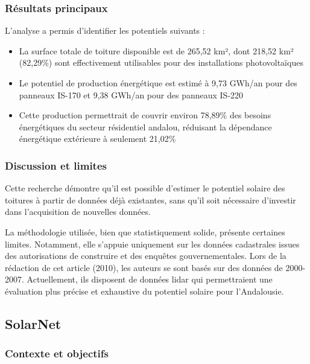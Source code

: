 \subsubsection{Résultats principaux}
\par{L'analyse a permis d'identifier les potentiels suivants :}
\begin{itemize}
    \item La surface totale de toiture disponible est de 265,52 km², dont 218,52 km² (82,29\%) sont effectivement utilisables pour des installations photovoltaïques
    \item Le potentiel de production énergétique est estimé à 9,73 GWh/an pour des panneaux IS-170 et 9,38 GWh/an pour des panneaux IS-220
    \item Cette production permettrait de couvrir environ 78,89\% des besoins énergétiques du secteur résidentiel andalou, réduisant la dépendance énergétique extérieure à seulement 21,02\%
\end{itemize}

\subsubsection{Discussion et limites}
\par{Cette recherche démontre qu'il est possible d'estimer le potentiel solaire des toitures à partir de données déjà existantes, sans qu'il soit nécessaire d'investir dans l’acquisition de nouvelles données.}

\par{La méthodologie utilisée, bien que statistiquement solide, présente certaines limites. Notamment, elle s'appuie uniquement sur les données cadastrales issues des autorisations de construire et des enquêtes gouvernementales. Lors de la rédaction de cet article (2010), les auteurs se sont basés sur des données de 2000-2007. Actuellement, ils disposent de données \gls{lidar} \cite{nacional_plan_nodate} qui permettraient une évaluation plus précise et exhaustive du potentiel solaire pour l'Andalousie.}

\subsection{SolarNet}

\par{}

\subsubsection{Contexte et objectifs}

